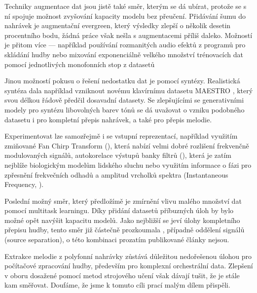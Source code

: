 Techniky augmentace dat jsou jistě také směr, kterým se dá ubírat, protože se s ní spojuje možnost zvyšování kapacity modelu bez přeučení. Přidávání šumu do nahrávek je augmentační evergreen, který výsledky zlepší o několik desetin procentního bodu, žádná práce však nešla s augmentacemi příliš daleko. Možností je přitom více --- například používání rozmanitých audio efektů z programů pro skládání hudby nebo mixování exponenciálně velkého množství trénovacích dat pomocí jednotlivých monofonních stop z datasetů 

Jinou možností pokusu o řešení nedostatku dat je pomocí syntézy. Realistická syntéza dala například vzniknout novému klavírnímu datasetu MAESTRO \citep{Hawthorne2018a}, který svou délkou řádově předčil dosavadní datasety. Se zlepšujícími se generativními modely pro syntézu libovolných barev tónů \citep{Engel2019} se dá uvažovat o vzniku podobného datasetu i pro kompletní přepis nahrávek, a také pro přepis melodie.

Experimentovat lze samozřejmě i se vstupní reprezentací, například využitím zmiňované Fan Chirp Transform (\cite{Cancela2010}), která nabízí velmi dobré rozlišení frekvenčně modulovaných signálů, autokorelace výstupů banky filtrů (\cite{Paiva2006}), která je zatím nejblíže biologickým modelům lidského sluchu nebo využitím informace o fázi pro zpřesnění frekvečních odhadů a amplitud vrcholků spektra (Instantaneous Frequency, \cite{Dressler2009}).

Poslední možný směr, který předložímě je zmírnění vlivu malého množství dat pomocí multitask learningu. Díky přidání datasetů příbuzných úloh by bylo možné opět navýšit kapacitu modelů. Jako nejbližší se jeví úlohy kompletního přepisu hudby, tento směr již částečně prozkoumala \cite{Bittner2018}, případně oddělení signálů (source separation), o této kombinaci prozatím publikované články nejsou. 

Extrakce melodie z polyfonní nahrávky zůstává důležitou nedořešenou úlohou pro počítačové zpracování hudby, především pro komplexní orchestrální data. Zlepšení v oboru dosažené pomocí metod strojového učení však dávají tušit, že je stále kam směřovat. Doufáme, že jsme k tomuto cíli prací malým dílem přispěli.
